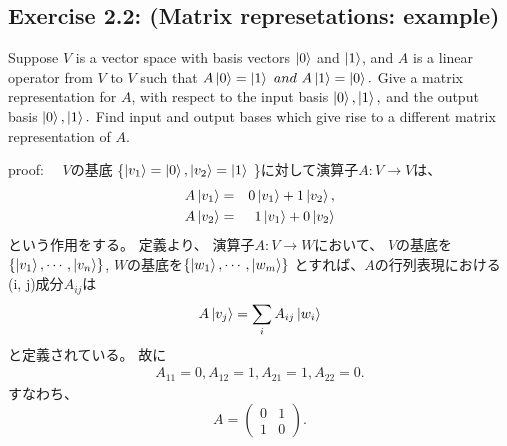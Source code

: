 \begin{flushleft}
\section{\Large Exercise 2.2: (Matrix represetations: example)}
 Suppose $V$ is a vector space with basis vectors $\ket{0}$ and $\ket{1}$,
and $A$ is a linear operator from $V$ to $V$ such that 
$A\ket{0} = \ket{1} ~and~ A\ket{1} = \ket{0}.$ 
Give a matrix representation for $A$, with respect to the input basis 
$\ket{0}, \ket{1},$ and the output basis $\ket{0}, \ket{1}.$ 
Find input and output bases which give rise to a different matrix representation of $A$.

\vspace{0.1in}
{\large proof:}
　$V$の基底
\{$
 \ket{v_1} = \ket{0}, \ket{v_2}=\ket{1} 
$
\}に対して演算子$A:V \to V $は、
\setcounter{equation}{0}
\begin{eqnarray*}
A\ket{v_1} &=& 0\ket{v_1} + 1\ket{v_2},\\
A\ket{v_2} &=& 1\ket{v_1} + 0\ket{v_2}
\end{eqnarray*}
という作用をする。
\newline
定義より、
\color{red}
演算子$A:V \to W $において、
$V$の基底を$\{\ket{v_1},\cdots, \ket{v_n}\}$, 
\newline
$W$の基底を$\{\ket{w_1},\cdots, \ket{w_m}\}$
\newline
とすれば、$A$の行列表現における(i, j)成分$A_{ij}$は
\begin{eqnarray}
A\ket{v_j} = \sum_{i} A_{ij} \ket{w_i}
\end{eqnarray}
と定義されている。
\color{black}
 故に
\begin{eqnarray*}
A_{11}=0,
A_{12}=1,
A_{21}=1,
A_{22}=0.
\end{eqnarray*}
\newline
すなわち、
\[
A = \left(
	\begin{array}{cc}
	0 & 1\\
	1 & 0
	\end{array}
	\right).
\]

 \end{flushleft}

